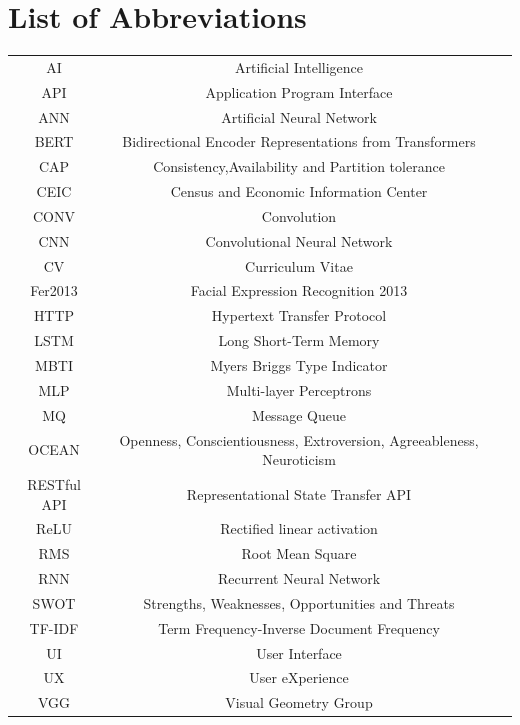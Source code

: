 \documentclass[a4paper,12pt]{report}
\begin{document}
\thispagestyle{empty}
\newpage






\tableofcontents 
\newpage


\listoffigures
\newpage

\listoftables
\newpage


\listofmyequations
\newpage

\section*{List of Abbreviations}

\begin{tabular}{ ccc }

AI & Artificial Intelligence  \\
API & Application Program Interface\\
ANN & Artificial Neural Network\\

BERT & Bidirectional Encoder Representations from Transformers \\

CAP & Consistency,Availability and Partition tolerance \\
CEIC & Census and Economic Information Center\\
CONV & Convolution\\
CNN & Convolutional Neural Network\\
CV & Curriculum Vitae\\

Fer2013 & Facial Expression Recognition 2013\\

HTTP & Hypertext Transfer Protocol\\

LSTM & Long Short-Term Memory\\

MBTI & Myers Briggs Type Indicator\\
MLP &  Multi-layer Perceptrons  \\
MQ & Message Queue\\

OCEAN & Openness, Conscientiousness, Extroversion, Agreeableness, Neuroticism \\


RESTful API & Representational State Transfer API\\
ReLU & Rectified linear activation\\
RMS & Root Mean Square\\
RNN & Recurrent Neural Network\\

SWOT & Strengths, Weaknesses, Opportunities and Threats\\

TF-IDF & Term Frequency-Inverse Document Frequency\\
UI & User Interface\\
UX & User eXperience \\
VGG & Visual Geometry Group \\

\end{tabular}
\end{document}
